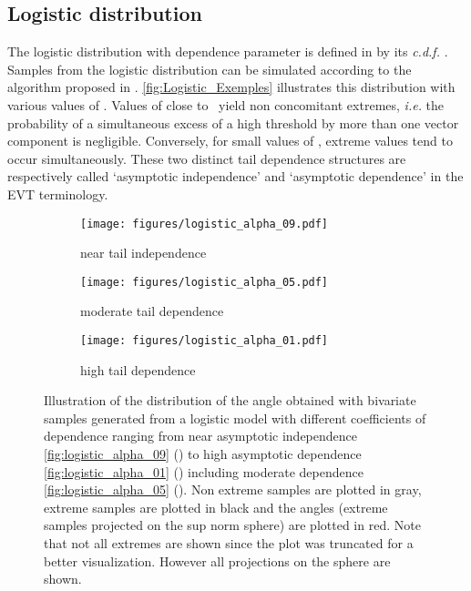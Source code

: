 \subsection{Logistic distribution} \label{logistic_Appendix}
The logistic distribution  with dependence  parameter   is defined in  by its  \textit{c.d.f.}
.
Samples from the  logistic distribution can be  simulated according to the algorithm proposed in  \citet{stephenson2003simulating}. \autoref{fig:Logistic_Exemples} illustrates this distribution with various values of . Values of  close to~ yield  non concomitant extremes, \emph{i.e.} the probability of a simultaneous excess of a high threshold by more than one vector component is negligible. Conversely, for small values of , extreme values tend to occur simultaneously. These two distinct tail dependence structures are respectively called  `asymptotic independence' and `asymptotic dependence' in the EVT terminology. 



\begin{figure}[tbh]
\begin{subfigure}[t]{0.32\textwidth}
    \texttt{[image: figures/logistic\_alpha\_09.pdf]}
    \caption{ near tail independence}
    \label{fig:logistic_alpha_09}
    \end{subfigure}
\begin{subfigure}[t]{0.32\textwidth}
    \texttt{[image: figures/logistic\_alpha\_05.pdf]}
    \caption{ moderate tail dependence}
    \label{fig:logistic_alpha_05}
        \end{subfigure}
\begin{subfigure}[t]{0.32\textwidth}
    \texttt{[image: figures/logistic\_alpha\_01.pdf]}
    \caption{high tail dependence}
    \label{fig:logistic_alpha_01}
\end{subfigure}
\caption{Illustration of the distribution of the angle  obtained with bivariate samples  generated from a logistic model with different coefficients of dependence ranging from near asymptotic independence  \autoref{fig:logistic_alpha_09} () to high asymptotic dependence \autoref{fig:logistic_alpha_01} () including moderate dependence \autoref{fig:logistic_alpha_05} (). Non extreme samples are plotted in gray, extreme samples are plotted in black and the angles   (extreme samples projected on the sup norm sphere) are plotted in red. Note that not all extremes are shown since the plot was truncated for a better visualization. However all projections on the sphere are shown.}
\label{fig:Logistic_Exemples}
\end{figure}



